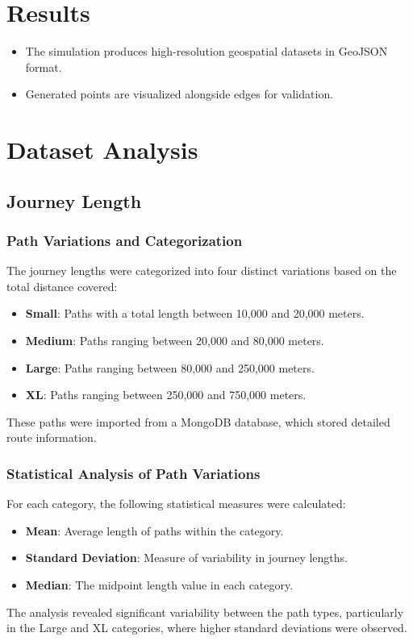 \documentclass[sigplan,screen]{acmart}
\begin{document}
\section{Results}
\begin{itemize}
    \item The simulation produces high-resolution geospatial datasets in GeoJSON format.
    \item Generated points are visualized alongside edges for validation.
\end{itemize}


\section{Dataset Analysis}

\subsection{Journey Length}
\subsubsection{Path Variations and Categorization}
The journey lengths were categorized into four distinct variations based on the total distance covered:
\begin{itemize}
    \item \textbf{Small}: Paths with a total length between 10,000 and 20,000 meters.
    \item \textbf{Medium}: Paths ranging between 20,000 and 80,000 meters.
    \item \textbf{Large}: Paths ranging between 80,000 and 250,000 meters.
    \item \textbf{XL}: Paths ranging between 250,000 and 750,000 meters.
\end{itemize}
These paths were imported from a MongoDB database, which stored detailed route information.

\subsubsection{Statistical Analysis of Path Variations}
For each category, the following statistical measures were calculated:
\begin{itemize}
    \item \textbf{Mean}: Average length of paths within the category.
    \item \textbf{Standard Deviation}: Measure of variability in journey lengths.
    \item \textbf{Median}: The midpoint length value in each category.
\end{itemize}
The analysis revealed significant variability between the path types, particularly in the Large and XL categories, where higher standard deviations were observed.
\end{document}
